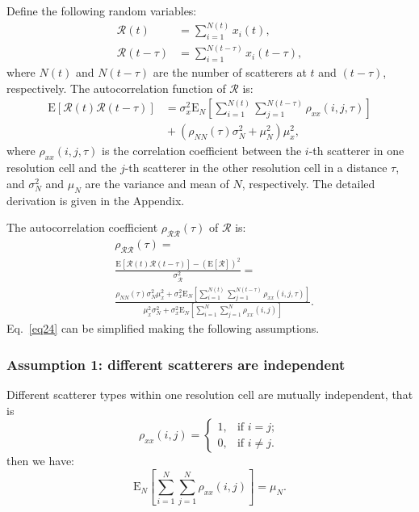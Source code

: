 \documentclass[journal]{IEEEtran}
\begin{document}
Define the following random variables:
\begin{align*}
\mathcal{R}(t)&=\sum_{i=1}^{N(t)} x_{i}(t),\\
\mathcal{R}(t-\tau)&=\sum_{i=1}^{N(t-\tau)} x_{i}(t-\tau),
\end{align*}
where $N(t)$ and $N(t-\tau)$ are the number of scatterers at $t$ and $(t-\tau)$, respectively.
The autocorrelation function of $\mathcal{R}$ is:
\begin{equation}
\begin{split}
\mathrm{E}[\mathcal{R}(t) \mathcal{R}(t-\tau)] & = \sigma_{x}^{2} \mathrm{E}_{N}\left[\sum_{i=1}^{N(t)} \sum_{j=1}^{N(t-\tau)} \rho_{x x}(i, j, \tau)\right] \\
& {} + (\rho_{N N}(\tau)\sigma_{N}^{2}+\mu_{N}^{2})\mu_{x}^{2},
\label{eq23}
\end{split}
\end{equation}
where $\rho_{x x}(i, j, \tau)$ is the correlation coefficient between the $i$-th scatterer in one resolution cell and the $j$-th scatterer in the other resolution cell in a distance $\tau$, and $\sigma_{N}^{2}$ and $\mu_N$ are the variance and mean of $N$, respectively.
The detailed derivation is given in the Appendix.

The autocorrelation coefficient $\rho_{\mathcal{R} \mathcal{R}}(\tau)$ of $\mathcal{R}$ is:
\begin{align}
& \rho_{\mathcal{R} \mathcal{R}}(\tau) = {}\nonumber\\
& \frac{\mathrm{E}[\mathcal{R}(t) \mathcal{R}(t-\tau)]-(\mathrm{E}[\mathcal{R}])^{2}}{\sigma_{\mathcal{R}}
^{2}} = {}\nonumber\\
& \frac{\rho_{N N}(\tau) \sigma_{N}^{2} \mu_{x}^{2}+\sigma_{x}^{2} \mathrm{E}_{N}\left[\sum_{i=1}^{N(t)} \sum_{j=1}^{N(t-\tau)} \rho_{x x}(i, j, \tau)\right]}{\mu_{x}^{2} \sigma_{N}^{2}+\sigma_{x}^{2} \mathrm{E}_{N}\left[\sum_{i=1}^{N} \sum_{j=1}^{N} \rho_{x x}(i, j)\right]}.\label{eq24}
\end{align}
Eq.~\eqref{eq24} can be simplified making the following assumptions.

\subsubsection{Assumption 1: different scatterers are independent}
Different scatterer types within one resolution cell are mutually independent, that is \cite{Allan:2006,Collins:2009}
\begin{equation}
\rho_{x x}(i,j) = \begin{cases}
1, & \text{if } i = j; \\
0, & \text{if } i \neq j.
\label{eq25}
\end{cases}
\end{equation}
then we have:
\begin{equation}
\mathrm{E}_{N}\left[\sum_{i=1}^{N} \sum_{j=1}^{N} \rho_{x x}(i, j)\right] = \mu_{N}.
\label{eq26}
\end{equation}
\end{document}
